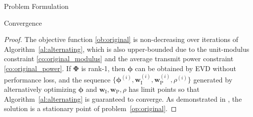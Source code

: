 \documentclass[journal]{IEEEtran}
\begin{document}
\begin{section}{Problem Formulation}
\begin{subsection}{Convergence}
			\begin{proof}\label{pf:ao}
				The objective function \eqref{ob:original} is non-decreasing over iterations of Algorithm~\ref{al:alternating}, which is also upper-bounded due to the unit-modulus constraint \eqref{co:original_modulus} and the average transmit power constraint \eqref{co:original_power}. If $\boldsymbol{\Phi}$ is rank-\num{1}, then $\boldsymbol{\phi}$ can be obtained by EVD without performance loss, and the sequence $\{\boldsymbol{\phi}^{(i)},\boldsymbol{w}_{\text{I}}^{(i)},\boldsymbol{w}_\text{P}^{(i)},\rho^{(i)}\}$ generated by alternatively optimizing $\boldsymbol{\phi}$ and $\boldsymbol{w}_{\text{I}},\boldsymbol{w}_\text{P},\rho$ has limit points so that Algorithm~\ref{al:alternating} is guaranteed to converge. As demonstrated in \cite{Grippo2000}, the solution is a stationary point of problem~\eqref{op:original}.
			\end{proof}
		\end{subsection}
	\end{section}
\end{document}
